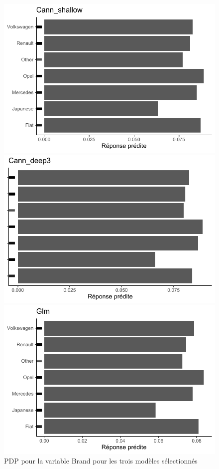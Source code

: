 \begin{figure}[b]
\caption{\label{fig:pdp3Brand} PDP pour la variable Brand pour les trois modèles sélectionnés}
\centering
\begin{minipage}{0.45\linewidth}
\includegraphics[scale=0.6]{Graphiques/pdpBrandShallow}
\end{minipage}
\hfill
\begin{minipage}{0.45\linewidth}
\includegraphics[scale=0.6]{Graphiques/pdpBrandCann}
\end{minipage}
\hfill
\begin{minipage}{0.45\linewidth}
\includegraphics[scale=0.6]{Graphiques/pdpBrandGlm}

\end{minipage}
\end{figure}
